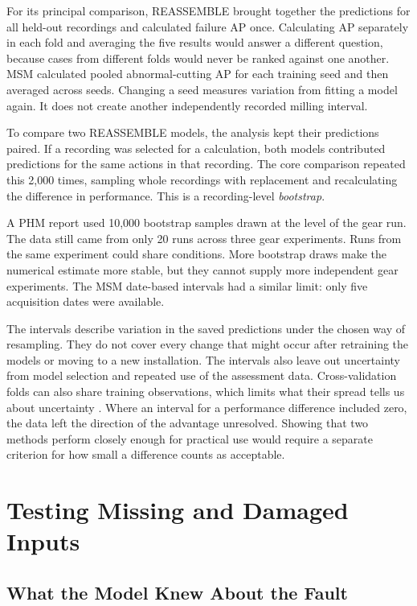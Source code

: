 For its principal comparison, REASSEMBLE brought together the predictions for all
held-out recordings and calculated failure AP once. Calculating AP separately in each
fold and averaging the five results would answer a different question, because cases
from different folds would never be ranked against one another. MSM calculated pooled
abnormal-cutting AP for each training seed and then averaged across seeds. Changing a
seed measures variation from fitting a model again. It does not create another
independently recorded milling interval.

To compare two REASSEMBLE models, the analysis kept their predictions paired. If a
recording was selected for a calculation, both models contributed predictions for the
same actions in that recording. The core comparison repeated this 2,000 times,
sampling whole recordings with replacement and recalculating the difference in
performance. This is a recording-level \emph{bootstrap}.

A PHM report used 10,000 bootstrap samples drawn at the level of the gear run. The data
still came from only 20 runs across three gear experiments. Runs from the same
experiment could share conditions. More bootstrap draws make the numerical estimate more
stable, but they cannot supply more independent gear experiments. The MSM date-based
intervals had a similar limit: only five acquisition dates were available.

The intervals describe variation in the saved predictions under the chosen way of
resampling. They do not cover every change that might occur after retraining the models
or moving to a new installation. The intervals also leave out uncertainty from model
selection and repeated use of the assessment data. Cross-validation folds can also share
training observations, which limits what their spread tells us about uncertainty
\parencite{Bengio2004CVVariance}. Where an interval for a performance difference
included zero, the data left the direction of the advantage unresolved. Showing that two
methods perform closely enough for practical use would require a separate criterion for
how small a difference counts as acceptable.

\section{Testing Missing and Damaged Inputs}
\label{sec:ch4-robustness}

\subsection{What the Model Knew About the Fault}

